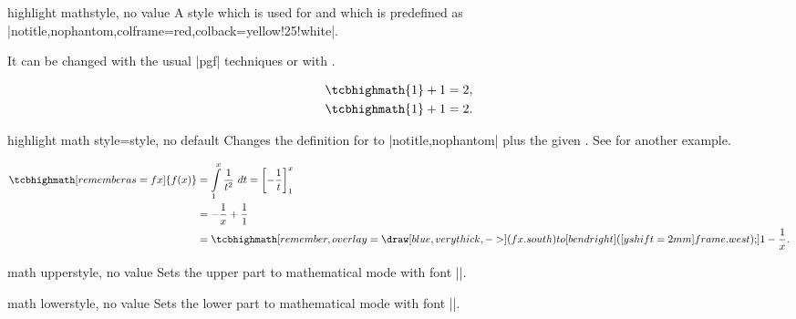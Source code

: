\clearpage

\begin{docTcbKey}{highlight math}{}{style, no value}
  A style which is used for  and which is
  predefined as |notitle,nophantom,colframe=red,colback=yellow!25!white|.\par
  It can be changed with the usual |pgf| techniques or
  with .
\begin{dispExample}
\begin{align*}
  \tcbhighmath{1} + 1 &= 2,\\
  \tcbset{highlight math/.append style={left=0mm,right=0mm,top=0mm,bottom=0mm}}
  \tcbhighmath{1} + 1 &= 2.
\end{align*}
\end{dispExample}

\end{docTcbKey}


\begin{docTcbKey}{highlight math style}{=}{style, no default}
  Changes the definition for  to
  |notitle,nophantom| plus the given .
  See  for another example.
\begin{dispExample}
\begin{align*}
\tcbhighmath[remember as=fx]{f(x)}
     &= \int\limits_{1}^{x} \frac{1}{t^2}~dt
      = \left[ -\frac{1}{t} \right]_{1}^{x}\\
     &= -\frac{1}{x} + \frac{1}{1}\\
     &=
\tcbhighmath[remember,overlay={%
    \draw[blue,very thick,->] (fx.south) to[bend right] ([yshift=2mm]frame.west);}]
  {1-\frac{1}{x}.}
\end{align*}
\end{dispExample}
\end{docTcbKey}

\clearpage
\begin{docTcbKey}{math upper}{}{style, no value}
  Sets the upper part to mathematical mode with font |\displaystyle|.
\end{docTcbKey}

\begin{docTcbKey}{math lower}{}{style, no value}
  Sets the lower part to mathematical mode with font |\displaystyle|.
\end{docTcbKey}

